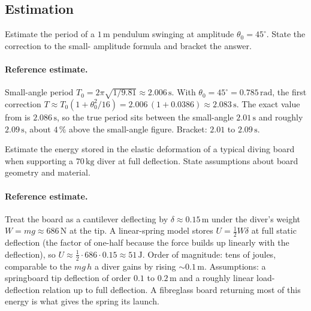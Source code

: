 \subsection*{Estimation}

\begin{exercise}
Estimate the period of a $1\,\si{\meter}$ pendulum swinging at
amplitude $\theta_0 = 45^{\circ}$. State the correction to the small-
amplitude formula and bracket the answer.

\paragraph{Reference estimate.} Small-angle period $T_0 = 2\pi\sqrt{1/
9.81} \approx 2.006\,\si{\second}$. With $\theta_0 = 45^\circ = 0.785\,
\si{\radian}$, the first correction $T \approx T_0(1 + \theta_0^2/16) =
2.006\,(1 + 0.0386) \approx 2.083\,\si{\second}$. The exact value from
 is $2.086\,\si{\second}$, so the true
period sits between the small-angle $2.01\,\si{\second}$ and roughly
$2.09\,\si{\second}$, about $4\,\%$ above the small-angle figure. Bracket:
$2.01$ to $2.09\,\si{\second}$.
\end{exercise}

\begin{exercise}
Estimate the energy stored in the elastic deformation of a typical
diving board when supporting a $70\,\si{\kilogram}$ diver at full
deflection. State assumptions about board geometry and material.

\paragraph{Reference estimate.} Treat the board as a cantilever
deflecting by $\delta \approx 0.15\,\si{\meter}$ under the diver's
weight $W = mg \approx 686\,\si{\newton}$ at the tip. A linear-spring
model stores $U = \tfrac12 W\delta$ at full static deflection (the
factor of one-half because the force builds up linearly with the
deflection), so $U \approx \tfrac12 \cdot 686 \cdot 0.15 \approx
51\,\si{\joule}$. Order of magnitude: tens of joules, comparable to the
$mg\,h$ a diver gains by rising $\sim 0.1\,\si{\meter}$. Assumptions: a
springboard tip deflection of order $0.1$ to $0.2\,\si{\meter}$ and a
roughly linear load-deflection relation up to full deflection. A
fibreglass board returning most of this energy is what gives the
spring its launch.
\end{exercise}


